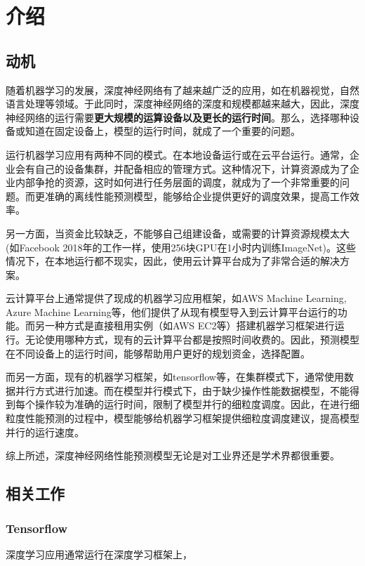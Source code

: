 \chapter{介绍}
\label{cha:intro}

\section{动机}
\label{sec:motivation}
    随着机器学习的发展，深度神经网络有了越来越广泛的应用，如在机器视觉，自然语言处理等领域。于此同时，深度神经网络的深度和规模都越来越大，因此，深度神经网络的运行需要{\bfseries 更大规模的运算设备以及更长的运行时间}。那么，选择哪种设备或知道在固定设备上，模型的运行时间，就成了一个重要的问题。

    运行机器学习应用有两种不同的模式。在本地设备运行或在云平台运行。通常，企业会有自己的设备集群，并配备相应的管理方式。这种情况下，计算资源成为了企业内部争抢的资源，这时如何进行任务层面的调度，就成为了一个非常重要的问题。而更准确的离线性能预测模型，能够给企业提供更好的调度效果，提高工作效率。
    
    另一方面，当资金比较缺乏，不能够自己组建设备，或需要的计算资源规模太大(如Facebook 2018年的工作一样，使用256块GPU在1小时内训练ImageNet)。这些情况下，在本地运行都不现实，因此，使用云计算平台成为了非常合适的解决方案。
    
    云计算平台上通常提供了现成的机器学习应用框架，如AWS Machine Learning, Azure Machine Learning等，他们提供了从现有模型导入到云计算平台运行的功能。而另一种方式是直接租用实例（如AWS EC2等）搭建机器学习框架进行运行。无论使用哪种方式，现有的云计算平台都是按照时间收费的。因此，预测模型在不同设备上的运行时间，能够帮助用户更好的规划资金，选择配置。
    
    而另一方面，现有的机器学习框架，如tensorflow等，在集群模式下，通常使用数据并行方式进行加速。而在模型并行模式下，由于缺少操作性能数据模型，不能得到每个操作较为准确的运行时间，限制了模型并行的细粒度调度。因此，在进行细粒度性能预测的过程中，模型能够给机器学习框架提供细粒度调度建议，提高模型并行的运行速度。
    
    综上所述，深度神经网络性能预测模型无论是对工业界还是学术界都很重要。

\section{相关工作}
\label{sec:related}

\subsection{Tensorflow}
    深度学习应用通常运行在深度学习框架上，
